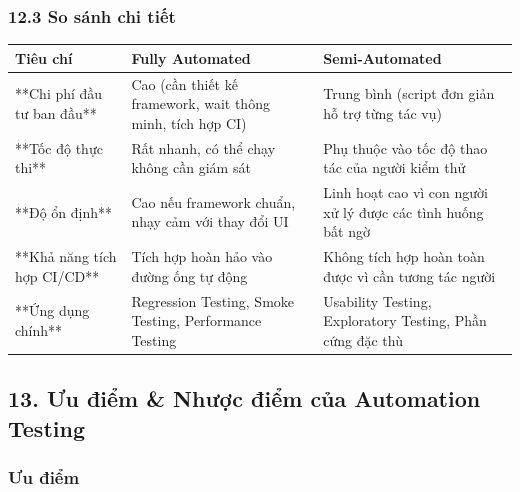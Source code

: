 \subsubsection{12.3 So sánh chi tiết}

\begin{table}[H]
\centering
\begin{tabular}{|l|l|l|}
\hline
\textbf{Tiêu chí} & \textbf{Fully Automated} & \textbf{Semi-Automated} \\ \hline
**Chi phí đầu tư ban đầu** & Cao (cần thiết kế framework, wait thông minh, tích hợp CI) & Trung bình (script đơn giản hỗ trợ từng tác vụ) \\ \hline
**Tốc độ thực thi** & Rất nhanh, có thể chạy không cần giám sát & Phụ thuộc vào tốc độ thao tác của người kiểm thử \\ \hline
**Độ ổn định** & Cao nếu framework chuẩn, nhạy cảm với thay đổi UI & Linh hoạt cao vì con người xử lý được các tình huống bất ngờ \\ \hline
**Khả năng tích hợp CI/CD** & Tích hợp hoàn hảo vào đường ống tự động & Không tích hợp hoàn toàn được vì cần tương tác người \\ \hline
**Ứng dụng chính** & Regression Testing, Smoke Testing, Performance Testing & Usability Testing, Exploratory Testing, Phần cứng đặc thù \\ \hline
\end{tabular}
\end{table}





\subsection{13. Ưu điểm \& Nhược điểm của Automation Testing}

\subsubsection{Ưu điểm}

